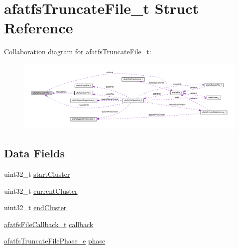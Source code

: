 \hypertarget{structafatfsTruncateFile__t}{\section{afatfs\+Truncate\+File\+\_\+t Struct Reference}
\label{structafatfsTruncateFile__t}
}


Collaboration diagram for afatfs\+Truncate\+File\+\_\+t\+:\nopagebreak
\begin{figure}[H]
\begin{center}
\leavevmode
\includegraphics[width=350pt]{structafatfsTruncateFile__t__coll__graph}
\end{center}
\end{figure}
\subsection*{Data Fields}
\begin{DoxyCompactItemize}
\item 
uint32\+\_\+t \hyperlink{structafatfsTruncateFile__t_a2cc9aa531e70ede1838b247730cd9f60}{start\+Cluster}
\item 
uint32\+\_\+t \hyperlink{structafatfsTruncateFile__t_a1c940f2ef6048ada0070a27ab71d523b}{current\+Cluster}
\item 
uint32\+\_\+t \hyperlink{structafatfsTruncateFile__t_aa1a34432a9ccba49674e43b0dbee7c95}{end\+Cluster}
\item 
\hyperlink{asyncfatfs_8h_aaa910b9db73f482a20cfa5a7f3970e7f}{afatfs\+File\+Callback\+\_\+t} \hyperlink{structafatfsTruncateFile__t_a2863ec97022df9d25d02c18bba32a6a6}{callback}
\item 
\hyperlink{asyncfatfs_8c_abb1abf7ee17841e2ab0580f317a351e2}{afatfs\+Truncate\+File\+Phase\+\_\+e} \hyperlink{structafatfsTruncateFile__t_ab37411af2bd2c31319bd5bd775345c82}{phase}
\end{DoxyCompactItemize}



